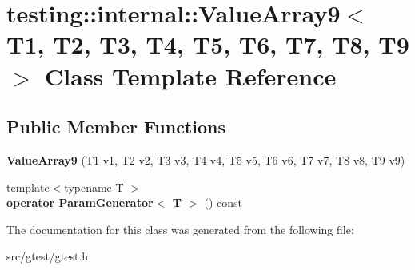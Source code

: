 \hypertarget{classtesting_1_1internal_1_1_value_array9}{}\section{testing\+:\+:internal\+:\+:Value\+Array9$<$ T1, T2, T3, T4, T5, T6, T7, T8, T9 $>$ Class Template Reference}
\label{classtesting_1_1internal_1_1_value_array9}
\subsection*{Public Member Functions}
\begin{DoxyCompactItemize}
\item 
\mbox{\label{classtesting_1_1internal_1_1_value_array9_a4985545b509dc5d7db659cd31b110c21}} 
{\bfseries Value\+Array9} (T1 v1, T2 v2, T3 v3, T4 v4, T5 v5, T6 v6, T7 v7, T8 v8, T9 v9)
\item 
\mbox{\label{classtesting_1_1internal_1_1_value_array9_aede7e5849cfab0504c49673d5c5c4cce}} 
{\footnotesize template$<$typename T $>$ }\\{\bfseries operator Param\+Generator$<$ T $>$} () const
\end{DoxyCompactItemize}


The documentation for this class was generated from the following file\+:\begin{DoxyCompactItemize}
\item 
src/gtest/gtest.\+h\end{DoxyCompactItemize}
